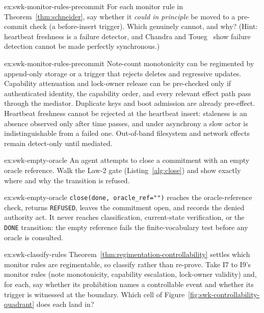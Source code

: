 \documentclass[11pt,a4paper]{article}
\theoremstyle{definition}
\theoremstyle{remark}
\begin{document}

\begin{pdexercise}[kind=Check,rating=1]{ex:swk-monitor-rules-precommit}
For each monitor rule in Theorem~\ref{thm:schneider}, say whether it \emph{could in principle} be moved to a pre-commit check (a before-insert trigger). Which genuinely cannot, and why? (Hint: heartbeat freshness is a failure detector, and Chandra and Toueg~ show failure detection cannot be made perfectly synchronous.)
\end{pdexercise}
\begin{pdsolution}{ex:swk-monitor-rules-precommit}
Note-count monotonicity can be regimented by append-only storage or a trigger that rejects deletes and regressive updates. Capability attenuation and lock-owner release can be pre-checked only if authenticated identity, the capability order, and every relevant effect path pass through the mediator. Duplicate keys and boot admission are already pre-effect. Heartbeat freshness cannot be rejected at the heartbeat insert: staleness is an absence observed only after time passes, and under asynchrony a slow actor is indistinguishable from a failed one. Out-of-band filesystem and network effects remain detect-only until mediated.
\end{pdsolution}
\begin{pdexercise}[kind=Trace,rating=2]{ex:swk-empty-oracle}
An agent attempts to close a commitment with an empty oracle reference. Walk the Law-2 gate (Listing~\ref{alg:close}) and show exactly where and why the transition is refused.
\end{pdexercise}
\begin{pdsolution}{ex:swk-empty-oracle}
\texttt{close(done, oracle\_ref="")} reaches the oracle-reference check, returns \texttt{REFUSED}, leaves the commitment open, and records the denied authority act. It never reaches classification, current-state verification, or the \texttt{DONE} transition: the empty reference fails the finite-vocabulary test before any oracle is consulted.
\end{pdsolution}
\begin{pdexercise}[kind=Trace,rating=2]{ex:swk-classify-rules}
Theorem~\ref{thm:regimentation-controllability} settles which monitor rules are regimentable, so classify rather than re-prove. Take I7 to I9's monitor rules (note monotonicity, capability escalation, lock-owner validity) and, for each, say whether its prohibition names a controllable event and whether its trigger is witnessed at the boundary. Which cell of Figure~\ref{fig:swk-controllability-quadrant} does each land in?
\end{pdexercise}
\end{document}
